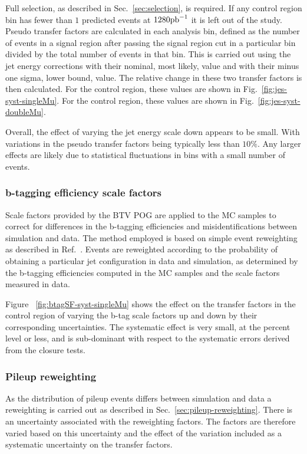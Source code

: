Full selection, as described in Sec.~\ref{sec:selection}, is required.
If any control region bin has fewer than $1$ predicted events at
$1280\ipb$ it is left out of the study.  Pseudo transfer factors are
calculated in each analysis bin, defined as the number of events in a
signal region after passing the signal region \alphat cut in a
particular bin divided by the total number of events in that bin. This
is carried out using the jet energy corrections with their nominal,
most likely, value and with their minus one sigma, lower bound,
value. The relative change in these two transfer factors is then
calculated. For the \mj control region, these values are shown in
Fig.~\ref{fig:jes-syst-singleMu}. For the \mmj control region, these
values are shown in Fig.~\ref{fig:jes-syst-doubleMu}.

Overall, the effect of varying the jet energy scale down appears to be
small. With variations in the pseudo transfer factors being typically
less than $10\%$. Any larger effects are likely due to statistical
fluctuations in bins with a small number of events.

\subsubsection{b-tagging efficiency scale factors}

Scale factors provided by the BTV POG are applied to the MC samples
to correct for differences in the b-tagging efficiencies and 
misidentifications between simulation and data. The method employed is
based on simple event reweighting as described in
Ref.~\cite{btagSFMethods}. Events are reweighted according to the
probability of obtaining a particular jet configuration in data
and simulation, as determined by the b-tagging efficiencies computed
in the MC samples and the scale factors measured in data.

Figure ~\ref{fig:btagSF-syst-singleMu} shows the effect on the transfer
factors in the \mj control region of varying the b-tag scale factors 
up and down by their corresponding uncertainties. The systematic
effect is very small, at the percent level or less, and is
sub-dominant with respect to the systematic errors derived from the 
closure tests.

\subsubsection{Pileup reweighting}

As the distribution of pileup events differs between simulation and
data a reweighting is carried out as described in
Sec.~\ref{sec:pileup-reweighting}. There is an uncertainty associated
with the reweighting factors. The factors are therefore varied based
on this uncertainty and the effect of the variation included as a
systematic uncertainty on the transfer factors.


